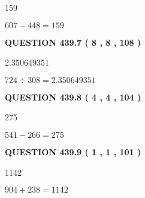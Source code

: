 \documentclass{ctexart}
\begin{document}
 
\noindent{}

159
 
 
 
 
\noindent{}

$ %
607 -  %
448=   %
159$
 
 
  
\vspace{0.2in}
  
{\textbf{\Large{QUESTION
439.7 
 ( 8 , 8 , 108 )
}}}
  
  
 
 
\noindent{}

2.350649351
 
 
 
 
\noindent{}

$ %
724 \div  %
308=   %
2.350649351$
 
 
  
\vspace{0.2in}
  
{\textbf{\Large{QUESTION
439.8 
 ( 4 , 4 , 104 )
}}}
  
  
 
 
\noindent{}

275
 
 
 
 
\noindent{}

$ %
541 -  %
266=   %
275$
 
 
  
\vspace{0.2in}
  
{\textbf{\Large{QUESTION
439.9 
 ( 1 , 1 , 101 )
}}}
  
  
 
 
\noindent{}

1142
 
 
 
 
\noindent{}

$ %
904 +  %
238=   %
1142$
 
\end{document}
